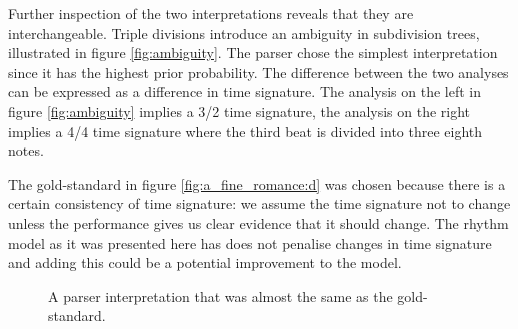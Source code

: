 Further inspection of the two interpretations reveals that they are interchangeable. Triple divisions introduce an ambiguity in subdivision trees, illustrated in figure \ref{fig:ambiguity}. The parser chose the simplest interpretation since it has the highest prior probability. The difference between the two analyses can be expressed as a difference in time signature. The analysis on the left in figure \ref{fig:ambiguity} implies a 3/2 time signature, the analysis on the right implies a 4/4 time signature where the third beat is divided into three eighth notes.

The gold-standard in figure \ref{fig:a_fine_romance:d} was chosen because there is a certain consistency of time signature: we assume the time signature not to change unless the performance gives us clear evidence that it should change. The rhythm model as it was presented here has does not penalise changes in time signature and adding this could be a potential improvement to the model.


\begin{figure}
\centering
{}



\caption{A parser interpretation that was almost the same as the gold-standard.}
\label{fig:a_fine_romance}
\end{figure}

